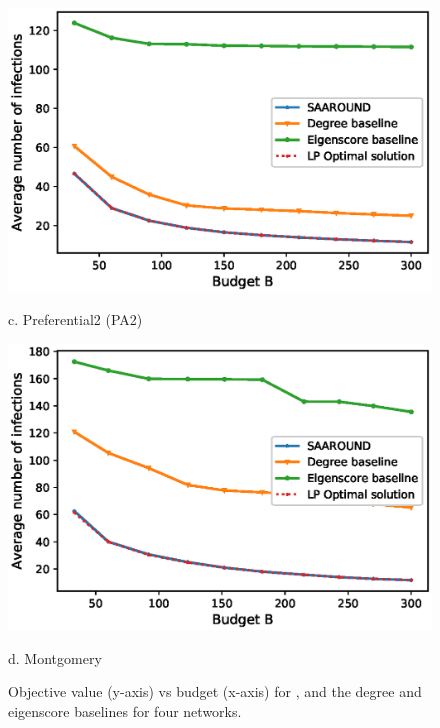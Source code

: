 \begin{figure}[ht]
  \begin{minipage}[b]{0.5\linewidth}
    \centering
    \includegraphics[scale=0.47]{Figuresnew/barabasi_approx} 
    \caption*{c. Preferential2 (PA2)} 
    \vspace{1.1ex}
  \end{minipage}%
  \begin{minipage}[b]{0.5\linewidth}
    \centering
    \includegraphics[scale=0.47]{Figuresnew/mont_approx} 
    \caption*{d. Montgomery} 
    \vspace{1.1ex}
  \end{minipage}
  \caption{Objective value (y-axis) vs budget (x-axis) for \algo{}, and the degree and eigenscore baselines for four networks.}
  \label{fig:performance} 
\end{figure}

